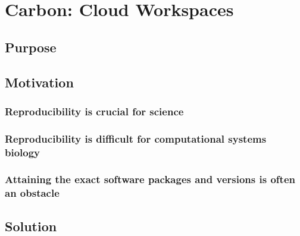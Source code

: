\chapter{Carbon: Cloud Workspaces}
\label{chap:carbon}

\section{Purpose}


\section{Motivation}
\subsection{Reproducibility is crucial for science}
\subsection{Reproducibility is difficult for computational systems biology}
\subsection{Attaining the exact software packages and versions is often an obstacle}


\section{Solution}
